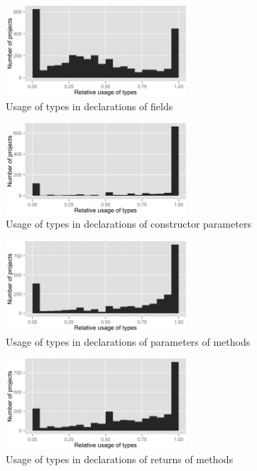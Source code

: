 \begin{figure}[h]
\centering 
\includegraphics[width=0.6\textwidth]{../aosd_2014/analysis/result/background/static-and-dynamic/histograms/10_Field.png} 
\caption{Usage of types in declarations of fields}
\end{figure}

\begin{figure}[h]
\centering 
\includegraphics[width=0.6\textwidth]{../aosd_2014/analysis/result/background/static-and-dynamic/histograms/9_Constructor_Parameter.png} 
\caption{Usage of types in declarations of constructor parameters}
\end{figure}

\begin{figure}[h]
\centering 
\includegraphics[width=0.6\textwidth]{../aosd_2014/analysis/result/background/static-and-dynamic/histograms/8_Method_Parameter.png} 
\caption{Usage of types in declarations of parameters of methods}
\end{figure}

\begin{figure}[h]
\centering 
\includegraphics[width=0.6\textwidth]{../aosd_2014/analysis/result/background/static-and-dynamic/histograms/7_Method_Return.png} 
\caption{Usage of types in declarations of returns of methods}
\end{figure}

